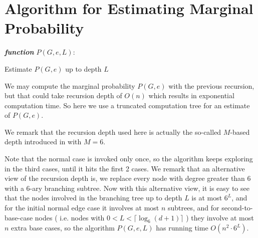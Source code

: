 
\section{Algorithm for Estimating Marginal Probability}

\IncMargin{1em}
\begin{algorithm}[H]
\emph{ \textbf{function} $P(G, e, L):$}
\BlankLine
{}
 \caption{Estimate $P(G,e)$ up to depth $L$}
\end{algorithm}
\DecMargin{1em}

We may compute the marginal probability $P(G, e)$ with the previous recursion, but
that could take recursion depth of $O(n)$ which results in exponential computation time.
So here we use a truncated computation tree for an estimate of $P(G,e)$.

We remark that the recursion depth used here is actually the so-called $M$-based depth introduced in \cite{LLY12} with $M=6$. 


Note that the normal case is invoked only once, so the algorithm keeps exploring in the third cases, until it hits the first 2 cases. We remark that an alternative view of the recursion depth is, we replace every node with degree greater than 6 with a $6$-ary branching subtree.
Now with this alternative view, it is easy to see that the nodes involved in the branching tree up to depth $L$ is at most $6^L$,
and for the initial normal edge case it involves at most $n$ subtrees, and for second-to-base-case nodes ( i.e. nodes with $0<L< \lceil \log_6{(d+1)} \rceil $ ) they involve at most $n$ extra base cases, 
so the algorithm $P(G,e,L)$ has running time $O(n^2 \cdot 6^L)$.
%


